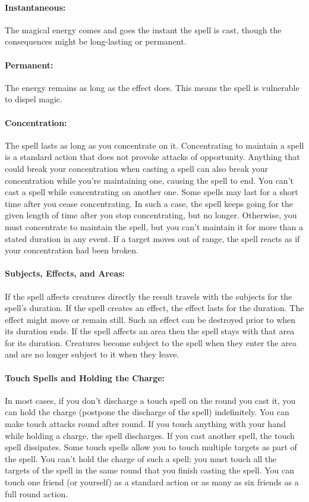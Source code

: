 \documentclass[../VancianToPsionics.tex]{subfiles}
\begin{document}
\paragraph{Instantaneous:} The magical energy comes and goes the instant the spell is cast, though the consequences might be long-lasting or permanent.

\paragraph{Permanent:} The energy remains as long as the effect does. This means the spell is vulnerable to dispel magic.

\paragraph{Concentration:} The spell lasts as long as you concentrate on it. Concentrating to maintain a spell is a standard action that does not provoke attacks of opportunity. Anything that could break your concentration when casting a spell can also break your concentration while you're maintaining one, causing the spell to end. You can't cast a spell while concentrating on another one. Some spells may last for a short time after you cease concentrating. In such a case, the spell keeps going for the given length of time after you stop concentrating, but no longer. Otherwise, you must concentrate to maintain the spell, but you can't maintain it for more than a stated duration in any event. If a target moves out of range, the spell reacts as if your concentration had been broken.

\paragraph{Subjects, Effects, and Areas:} If the spell affects creatures directly the result travels with the subjects for the spell's duration. If the spell creates an effect, the effect lasts for the duration. The effect might move or remain still. Such an effect can be destroyed prior to when its duration ends. If the spell affects an area then the spell stays with that area for its duration. Creatures become subject to the spell when they enter the area and are no longer subject to it when they leave.

\paragraph{Touch Spells and Holding the Charge:} In most cases, if you don't discharge a touch spell on the round you cast it, you can hold the charge (postpone the discharge of the spell) indefinitely. You can make touch attacks round after round. If you touch anything with your hand while holding a charge, the spell discharges. If you cast another spell, the touch spell dissipates.
Some touch spells allow you to touch multiple targets as part of the spell. You can't hold the charge of such a spell; you must touch all the targets of the spell in the same round that you finish casting the spell. You can touch one friend (or yourself) as a standard action or as many as six friends as a full round action.
\end{document}
